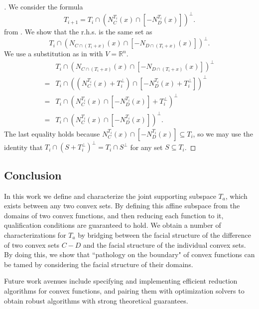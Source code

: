 \documentclass{article}
\theoremstyle{plain}
\theoremstyle{definition}
\theoremstyle{remark}
\begin{document}
\begin{proof}[\hypertarget{loc:simplified_iterative_bilateral_facial_reduction.proof}Proof of \Cref{loc:simplified_iterative_bilateral_facial_reduction.statement}]

We consider the formula
\begin{equation*}
T_{i+1} = T_i \cap (N^{T_i}_{C}(x) \cap [-N^{T_i}_{D}(x)])^\perp.
\end{equation*}
from  .
We show that the r.h.s. is the same set as
\begin{equation*}
T_i \cap (N_{C \cap (T_i + x)}(x) \cap [-N_{D \cap (T_i+x)}(x)])^\perp.
\end{equation*}
We use a substitution as in  with $V = \mathbb{R}^n$.
\begin{align*}
&T_i \cap (N_{C \cap (T_i + x)}(x) \cap [-N_{D \cap (T_i+x)}(x)])^\perp\\
= &T_i \cap ((N^{T_i}_{C}(x) + T_i^\perp) \cap [-N^{T_i}_{D}(x) + T_i^\perp])^\perp\\
= &T_i \cap (N^{T_i}_{C}(x) \cap [-N^{T_i}_{D}(x)] + T_i^\perp)^\perp\\
= &T_i \cap (N^{T_i}_{C}(x) \cap [-N^{T_i}_{D}(x)])^\perp.
\end{align*}
The last equality holds because $N^{T_i}_{C}(x) \cap [-N^{T_i}_{D}(x)] \subseteq T_i$, so we may use the
identity that $T_i \cap (S + T_i^\perp)^\perp = T_i \cap S^\perp$ 
for any set $S \subseteq T_i$.
\end{proof}
\subsection{Conclusion}
\label{loc:body.proofs.conclusion}
In this work we define and characterize the joint supporting subspace $T_a$, which exists between any two
convex sets. By defining this affine subspace from the domains of two convex functions, and then reducing each function to it, qualification conditions are guaranteed to hold. We obtain a number of characterizations for $T_a$ by bridging between the facial structure of the difference of two convex sets $C-D$ and the facial structure of the individual convex sets. By doing this, we show that ``pathology on the boundary" of convex functions can be tamed by considering the facial structure of their domains.

Future work avenues include specifying and implementing efficient reduction
algorithms for convex functions, and pairing them with optimization solvers to obtain robust algorithms with strong theoretical guarantees.
\end{document}
